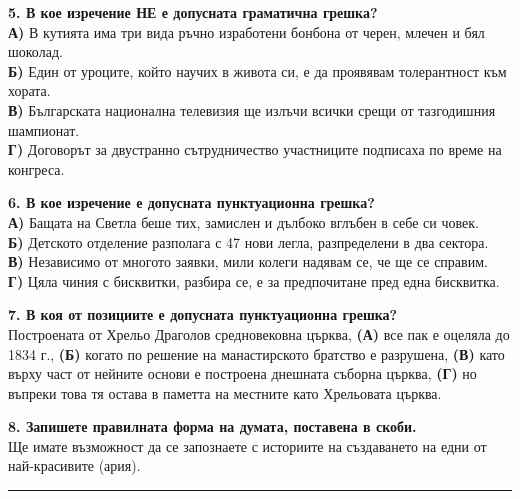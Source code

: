 \documentclass[12pt,a4paper]{article}
\begin{document}
\vspace{0.6cm}

\noindent
\textbf{5. В кое изречение НЕ е допусната граматична грешка?} \\
\textbf{А)} В кутията има три вида ръчно изработени бонбона от черен, млечен и бял шоколад. \\
\textbf{Б)} Един от уроците, който научих в живота си, е да проявявам толерантност към хората. \\
\textbf{В)} Българската национална телевизия ще излъчи всички срещи от тазгодишния шампионат. \\
\textbf{Г)} Договорът за двустранно сътрудничество участниците подписаха по време на конгреса.

\vspace{0.6cm}

\noindent
\textbf{6. В кое изречение е допусната пунктуационна грешка?} \\
\textbf{А)} Бащата на Светла беше тих, замислен и дълбоко вглъбен в себе си човек. \\
\textbf{Б)} Детското отделение разполага с 47 нови легла, разпределени в два сектора. \\
\textbf{В)} Независимо от многото заявки, мили колеги надявам се, че ще се справим. \\
\textbf{Г)} Цяла чиния с бисквитки, разбира се, е за предпочитане пред една бисквитка.

\vspace{0.6cm}

\noindent
\textbf{7. В коя от позициите е допусната пунктуационна грешка?} \\
Построената от Хрельо Драголов средновековна църква, \textbf{(А)} все пак е оцеляла до 1834 г., \textbf{(Б)} когато по решение на манастирското братство е разрушена, \textbf{(В)} като върху част от нейните основи е построена днешната съборна църква, \textbf{(Г)} но въпреки това тя остава в паметта на местните като Хрельовата църква.

\vspace{0.6cm}

\noindent
\textbf{8. Запишете правилната форма на думата, поставена в скоби.} \\
Ще имате възможност да се запознаете с историите на създаването на едни от най-красивите (ария).

\vspace{0.2cm}
\noindent\rule{\linewidth}{0.4pt}

\vspace{0.4cm}
\end{document}
